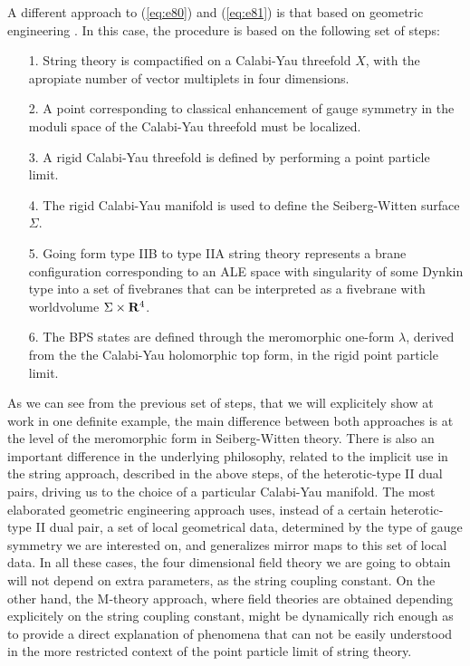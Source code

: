 A different approach to (\ref{eq:e80}) and (\ref{eq:e81}) is that
based on geometric engineering \cite{ge}. In this case, the procedure is
based on the following set of steps:
\begin{itemize}
	\item[{1.}] String theory is compactified on a Calabi-Yau
threefold $X$, with the apropiate number of vector multiplets in
four dimensions.
	\item[{2.}] A point corresponding to classical enhancement of gauge 
symmetry in the moduli space of the Calabi-Yau
threefold must be localized.
	\item[{3.}] A rigid Calabi-Yau threefold is defined by
performing a point particle limit.
	\item[{4.}] The rigid Calabi-Yau manifold is used to
define the Seiberg-Witten surface $\Sigma$.
	\item[{5.}] Going form type IIB to type IIA string theory
represents a brane configuration corresponding to an ALE space
with singularity of some Dynkin type into a set of fivebranes
that can be interpreted as a fivebrane with worldvolume $\Sigma
\times {\bf R}^4$.
	\item[{6.}] The BPS states are defined through the
meromorphic one-form $\lambda$, derived from the the Calabi-Yau
holomorphic top form, in the rigid point particle limit.
\end{itemize}
  
As we can see from the previous set of steps, that we will
explicitely show at work in one definite example, the main
difference between both approaches is at the level of the
meromorphic form in Seiberg-Witten theory. There is also an
important difference in the underlying philosophy, related to the
implicit use in the string approach, described in the above
steps, of the heterotic-type II dual pairs, driving us to the
choice of a particular Calabi-Yau manifold. The most elaborated
geometric engineering approach uses, instead of a certain
heterotic-type II dual pair, a set of local geometrical data,
determined by the type of gauge symmetry we are interested on,
and generalizes mirror maps to this set of local data. In all
these cases, the four dimensional field theory we are going to
obtain will not depend on extra parameters, as the string
coupling constant. On the other hand, the M-theory approach,
where field theories are obtained depending explicitely on the
string coupling constant, might be dynamically rich enough as to
provide a direct explanation of phenomena that can not be easily
understood in the more restricted context of the point particle
limit of string theory.
  
